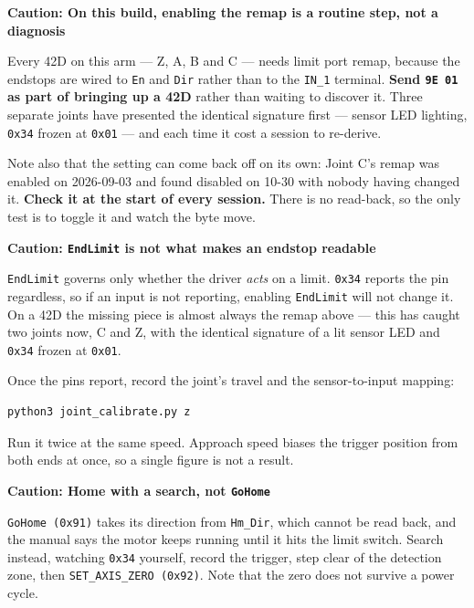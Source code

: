 \documentclass[11pt,letterpaper]{article}
\newenvironment{caution}[1]{%
    \par\addvspace{8pt}%
    \noindent{\color{cautionred}\rule{\linewidth}{0.8pt}}\par\vspace{2pt}
    \noindent\textbf{\color{cautionred}Caution: #1}\par\vspace{2pt}
}{%
    \par\vspace{2pt}\noindent{\color{cautionred}\rule{\linewidth}{0.4pt}}%
    \par\addvspace{8pt}%
}
\begin{document}
\begin{caution}{On this build, enabling the remap is a routine step, not a diagnosis}
Every 42D on this arm --- Z, A, B and C --- needs limit port remap, because the
endstops are wired to \texttt{En} and \texttt{Dir} rather than to the
\texttt{IN\_1} terminal. \textbf{Send \texttt{9E 01} as part of bringing up a
42D} rather than waiting to discover it. Three separate joints have presented
the identical signature first --- sensor LED lighting, \texttt{0x34} frozen at
\texttt{0x01} --- and each time it cost a session to re-derive.

Note also that the setting can come back off on its own: Joint C's remap was
enabled on 2026-09-03 and found disabled on 10-30 with nobody having changed it.
\textbf{Check it at the start of every session.} There is no read-back, so the
only test is to toggle it and watch the byte move.
\end{caution}

\begin{caution}{\texttt{EndLimit} is not what makes an endstop readable}
\texttt{EndLimit} governs only whether the driver \emph{acts} on a limit.
\texttt{0x34} reports the pin regardless, so if an input is not reporting,
enabling \texttt{EndLimit} will not change it. On a 42D the missing piece is
almost always the remap above --- this has caught two joints now, C and Z, with
the identical signature of a lit sensor LED and \texttt{0x34} frozen at
\texttt{0x01}.
\end{caution}

Once the pins report, record the joint's travel and the sensor-to-input mapping:

\begin{lstlisting}
python3 joint_calibrate.py z
\end{lstlisting}

Run it twice at the same speed. Approach speed biases the trigger position from
both ends at once, so a single figure is not a result.

\begin{caution}{Home with a search, not \texttt{GoHome}}
\texttt{GoHome (0x91)} takes its direction from \texttt{Hm\_Dir}, which cannot be
read back, and the manual says the motor keeps running until it hits the limit
switch. Search instead, watching \texttt{0x34} yourself, record the trigger, step
clear of the detection zone, then \texttt{SET\_AXIS\_ZERO (0x92)}. Note that the
zero does not survive a power cycle.
\end{caution}
\end{document}
